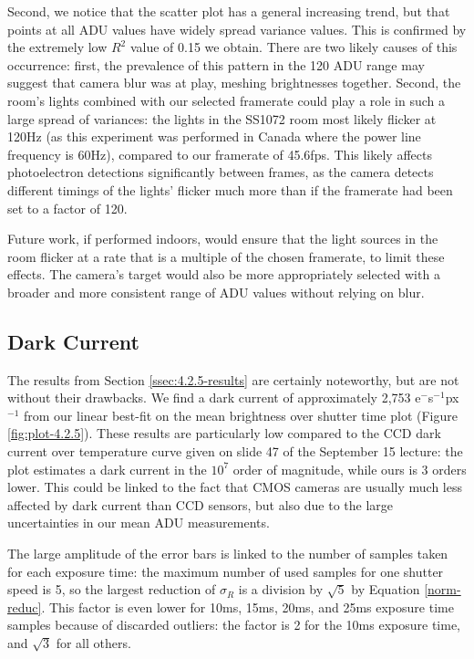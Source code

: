 \documentclass[preprint2]{aastex702}
\begin{document}
			Second, we notice that the scatter plot has a general increasing trend, but that points at all ADU values have widely spread variance values. This is confirmed by the extremely low $R^2$ value of 0.15 we obtain. There are two likely causes of this occurrence: first, the prevalence of this pattern in the 120 ADU range may suggest that camera blur was at play, meshing brightnesses together. Second, the room's lights combined with our selected framerate could play a role in such a large spread of variances: the lights in the SS1072 room most likely flicker at 120Hz (as this experiment was performed in Canada where the power line frequency is 60Hz), compared to our framerate of 45.6fps. This likely affects photoelectron detections significantly between frames, as the camera detects different timings of the lights' flicker much more than if the framerate had been set to a factor of 120.

			Future work, if performed indoors, would ensure that the light sources in the room flicker at a rate that is a multiple of the chosen framerate, to limit these effects. The camera's target would also be more appropriately selected with a broader and more consistent range of ADU values without relying on blur.

		\subsection{Dark Current}\label{ssec:4.2.5-disc}

			The results from Section \ref{ssec:4.2.5-results} are certainly noteworthy, but are not without their drawbacks. We find a dark current of approximately 2,753 e$^-$s$^{-1}$px$^{-1}$ from our linear best-fit on the mean brightness over shutter time plot (Figure \ref{fig:plot-4.2.5}). These results are particularly low compared to the CCD dark current over temperature curve given on slide 47 of the September 15 lecture: the plot estimates a dark current in the $10^7$ order of magnitude, while ours is 3 orders lower. This could be linked to the fact that CMOS cameras are usually much less affected by dark current than CCD sensors, but also due to the large uncertainties in our mean ADU measurements.

			The large amplitude of the error bars is linked to the number of samples taken for each exposure time: the maximum number of used samples for one shutter speed is 5, so the largest reduction of $\sigma_R$ is a division by $\sqrt{5}$ by Equation \ref{norm-reduc}. This factor is even lower for 10ms, 15ms, 20ms, and 25ms exposure time samples because of discarded outliers: the factor is 2 for the 10ms exposure time, and $\sqrt{3}$ for all others.
\end{document}
